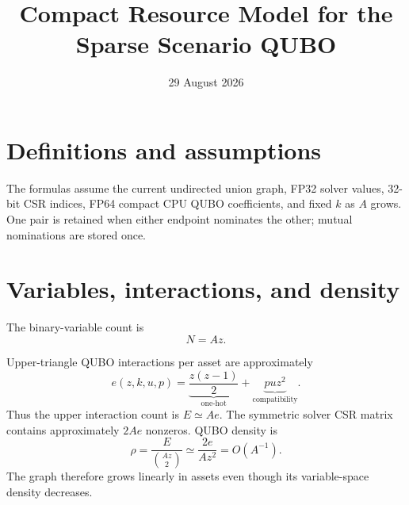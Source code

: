\documentclass[10pt,a4paper]{article}
\title{Compact Resource Model for the Sparse Scenario QUBO}
\author{}
\date{29 August 2026}
\begin{document}
\maketitle
\vspace{-1.5em}

\section*{Definitions and assumptions}


The formulas assume the current undirected union graph, FP32 solver values,
32-bit CSR indices, FP64 compact CPU QUBO coefficients, and fixed $k$ as $A$
grows.  One pair is retained when either endpoint nominates the other; mutual
nominations are stored once.

\section*{Variables, interactions, and density}

The binary-variable count is
\begin{equation}
  N = Az.
\end{equation}

Upper-triangle QUBO interactions per asset are approximately
\begin{equation}
  e(z,k,u,p)
  = \underbrace{\frac{z(z-1)}{2}}_{\text{one-hot}}
  + \underbrace{puz^2}_{\text{compatibility}}.
  \label{eq:edges}
\end{equation}
Thus the upper interaction count is $E\simeq Ae$.  The symmetric solver CSR
matrix contains approximately $2Ae$ nonzeros.  QUBO density is
\begin{equation}
  \rho
  = \frac{E}{\binom{Az}{2}}
  \simeq \frac{2e}{Az^2}
  = O(A^{-1}).
\end{equation}
The graph therefore grows linearly in assets even though its variable-space
density decreases.
\end{document}
